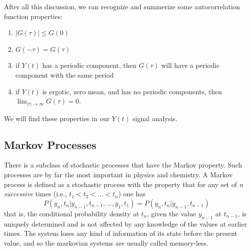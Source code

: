 \documentclass[12pt,a4paper]{report}
\begin{document}
After all this discussion, we can recognize and summerize some autocorrelation function properties:
\begin{enumerate}
 \item $|G(\tau)| \leq G(0)$
 \item $G(-\tau) = G(\tau)$
 \item if $Y(t)$ has a periodic component, then $G(\tau)$ will have a periodic component with the same period
 \item if $Y(t)$ is ergotic, zero mean, and has no periodic components, then $\lim_{|\tau|\to\infty}G(\tau) = 0$.
\end{enumerate}

We will find these properties in our $Y(t)$ signal analysis. 



\subsection{Markov Processes}
There is a subclass of stochastic processes that have the Markov property. Such processes are by far the most important in physics and chemistry. A Markov process is defined as a stochastic process with the property that for any set of \emph{n successive} times (i.e., $t_{1} < t_{2} < ... < t_{n}$) one has
\begin{equation}\label{Markov}
P(y_{n},t_{n}|y_{n-1},t_{n-1},...,y_{1},t_{1}) = P(y_{n},t_{n}|y_{n-1},t_{n-1})
\end{equation}
that is, the conditional probability density at $t_{n}$, given the value $y_{n-1}$ at $t_{n-1}$, is uniquely determined and is not affected by any knowledge of the values at earlier times. The system loses any kind of information of its state before the present value, and so the markovian systems are usually called memory-less.
\end{document}
